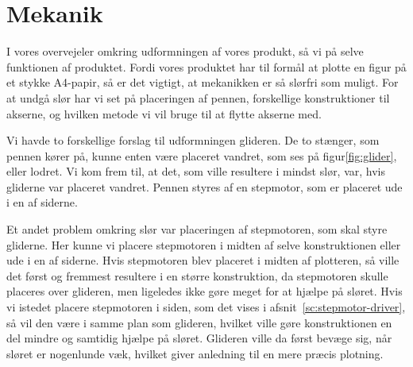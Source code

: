 \chapter[Design af mekanik]{Mekanik}


I vores overvejeler omkring udformningen af vores produkt, så vi på
selve funktionen af produktet. Fordi vores produktet har til formål at
plotte en figur på et stykke A4-papir, så er det vigtigt, at
mekanikken er så slørfri som muligt. For at undgå slør har vi set på
placeringen af pennen, forskellige konstruktioner til akserne, og
hvilken metode vi vil bruge til at flytte akserne med.

Vi havde to forskellige forslag til udformningen glideren. De to
stænger, som pennen kører på, kunne enten være placeret vandret, som
ses på figur\vref{fig:glider}, eller lodret. Vi kom frem
til, at det, som ville resultere i mindst slør, var, hvis gliderne var
placeret vandret. Pennen styres af en stepmotor, som er placeret ude i
en af siderne.


Et andet problem omkring slør var placeringen af stepmotoren, som skal
styre gliderne. Her kunne vi placere stepmotoren i midten af selve
konstruktionen eller ude i en af siderne. Hvis
stepmotoren blev placeret i midten af plotteren, så ville det først og
fremmest resultere i en større konstruktion, da stepmotoren skulle
placeres over glideren, men ligeledes ikke gøre meget for at hjælpe på
sløret. Hvis vi istedet placere stepmotoren i siden, som det vises i
afsnit~\vref{sc:stepmotor-driver}, så vil den være i
samme plan som glideren, hvilket ville gøre konstruktionen en del
mindre og samtidig hjælpe på sløret. Glideren ville da først bevæge sig,
når sløret er nogenlunde væk, hvilket giver anledning til en mere
præcis plotning.

